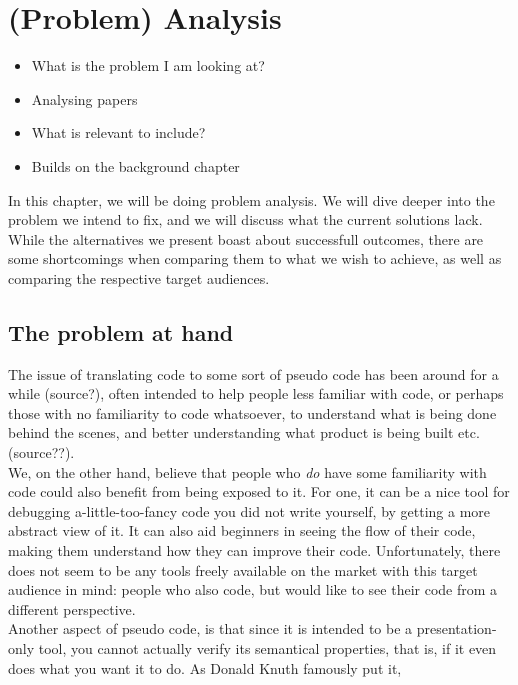 \chapter{(Problem) Analysis}
\begin{itemize}
    \item What is the problem I am looking at?
    \item Analysing papers
    \item What is relevant to include?
    \item Builds on the background chapter
\end{itemize}

In this chapter, we will be doing problem analysis. We will dive deeper into the problem we intend to fix, and we will discuss what the current solutions lack. While the alternatives we present boast about successfull outcomes, there are some shortcomings when comparing them to what we wish to achieve, as well as comparing the respective target audiences. \hfill \\

\section{The problem at hand}

The issue of translating code to some sort of pseudo code has been around for a while (source?), often intended to help people less familiar with code, or perhaps those with no familiarity to code whatsoever, to understand what is being done behind the scenes, and better understanding what product is being built etc. (source??). \hfill \\

We, on the other hand, believe that people who \textit{do} have some familiarity with code could also benefit from being exposed to it. For one, it can be a nice tool for debugging a-little-too-fancy code you did not write yourself, by getting a more abstract view of it. It can also aid beginners in seeing the flow of their code, making them understand how they can improve their code. Unfortunately, there does not seem to be any tools freely available on the market with this target audience in mind: people who also code, but would like to see their code from a different perspective. \hfill \\

Another aspect of pseudo code, is that since it is intended to be a presentation-only tool, you cannot actually verify its semantical properties, that is, if it even does what you want it to do. As Donald Knuth famously put it,


